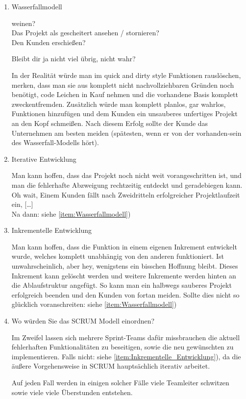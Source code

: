 \documentclass{article}
\newcommand{\gqq}[1]{\glqq{}#1\grqq{}}
\begin{document}
    \begin{enumerate}[label=\alph*.]
        \item Wasserfallmodell
        \label{item:Wasserfallmodell}
        
            weinen?\\
            Das Projekt als gescheitert ansehen / stornieren?\\
            Den Kunden erschießen?

            Bleibt dir ja nicht viel übrig, nicht wahr?

            In der Realität würde man im \gqq{quick and dirty} style Funktionen rauslöschen, merken, dass man sie aus komplett nicht nachvollziehbaren Gründen noch benötigt, code Leichen in Kauf nehmen und die vorhandene Basis komplett zweckentfremden.
            Zusätzlich würde man komplett planlos, gar wahrlos, Funktionen hinzufügen und dem Kunden ein unsauberes unfertiges Projekt an den Kopf schmeißen.
            Nach diesem \gqq{Erfolg} sollte der Kunde das Unternehmen am besten meiden (spätesten, wenn er von der vorhanden-sein des Wasserfall-Modells hört).

        \item Iterative Entwicklung
        
            Man kann hoffen, dass das Projekt noch nicht weit vorangeschritten ist, und man die fehlerhafte Abzweigung rechtzeitig entdeckt und \gqq{geradebiegen} kann.
            Oh wait, \gqq{Einem Kunden fällt nach Zweidritteln erfolgreicher Projektlaufzeit ein,  [\ldots]}\\
            Na dann: siehe \ref{item:Wasserfallmodell})
        
        \item Inkrementelle Entwicklung
        \label{item:Inkrementelle_Entwicklung}
        
            Man kann hoffen, dass die Funktion in einem eigenen Inkrement entwickelt wurde, welches komplett unabhängig von den anderen funktioniert.
            Ist unwahrscheinlich, aber hey, wenigstens ein bisschen Hoffnung bleibt.
            Dieses Inkrement kann gelöscht werden und weitere Inkremente werden \gqq{hinten} an die Ablaufstruktur angefügt.
            So kann man ein halbwegs sauberes Projekt erfolgreich beenden und den Kunden von fortan meiden.
            Sollte dies nicht so glücklich voranschreiten: siehe \ref{item:Wasserfallmodell})

        \item Wo würden Sie das SCRUM Modell einordnen?
        
            Im Zweifel lassen sich mehrere Sprint-Teams dafür missbrauchen die aktuell \gqq{fehlerhaften} Funktionalitäten zu beseitigen, sowie die neu gewünschten zu implementieren.
            Falls nicht: siehe \ref{item:Inkrementelle_Entwicklung}), da die äußere Vorgehensweise in SCRUM hauptsächlich iterativ arbeitet.
        
            Auf jeden Fall werden in einigen solcher Fälle viele Teamleiter schwitzen sowie viele viele Überstunden entstehen.
    \end{enumerate}
\end{document}
